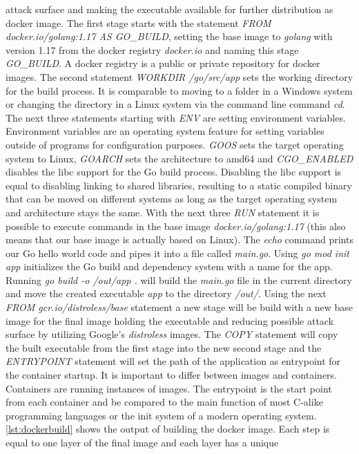 \documentclass[titlepage]{report}
\begin{document}
attack surface and making the executable available for further distribution as docker image. The first stage starts with the statement
\emph{FROM docker.io/golang:1.17 AS GO\_BUILD}, setting the base image to \emph{golang} with version 1.17 from the docker registry \emph{docker.io}
and naming this stage \emph{GO\_BUILD}. A docker registry is a public or private repository for docker images. 
The second statement \emph{WORKDIR /go/src/app} sets the working directory for the build process. It is comparable to moving to a folder
in a Windows system or changing the directory in a Linux system via the command line command \emph{cd}. The next three statements starting
with \emph{ENV} are setting environment variables. Environment variables are an operating system feature for setting variables outside
of programs for configuration purposes. \emph{GOOS} sets the target operating system to Linux, \emph{GOARCH} sets the architecture to amd64
and \emph{CGO\_ENABLED} disables the libc support for the Go build process. Disabling the libc support is equal to disabling linking
to shared libraries, resulting to a static compiled binary that can be moved on different systems as long as the target operating system
and architecture stays the same. With the next three \emph{RUN} statement it is possible to execute commands in the base image
\emph{docker.io/golang:1.17} (this also means that our base image is actually based on Linux). The \emph{echo} command
prints our Go hello world code and pipes it into a file called \emph{main.go}. Using \emph{go mod init app} initializes
the Go build and dependency system with a name for the app. Running \emph{go build -o /out/app .} will build the \emph{main.go}
file in the current directory and move the created executable \emph{app} to the directory \emph{/out/}. Using the next
\emph{FROM gcr.io/distroless/base} statement a new stage will be build with a new base image for the final image holding the executable
and reducing possible attack surface by utilizing Google's \emph{distroless} images. The \emph{COPY} statement will
copy the built executable from the first stage into the new second stage and the \emph{ENTRYPOINT} statement will set
the path of the application as entrypoint for the container startup. It is important to differ between images and containers.
Containers are running instances of images. The entrypoint is the start point from each container and be compared to the main function
of most C-alike programming languages or the init system of a modern operating system. \autoref{lst:dockerbuild} shows
the output of building the docker image. Each step is equal to one layer of the final image and each layer has a unique
\end{document}
